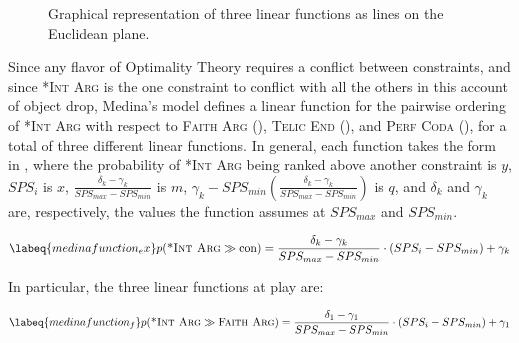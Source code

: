 \begin{figure}[htb]
\caption{Graphical representation of three linear functions as lines on the Euclidean plane.}
\end{figure}

Since any flavor of Optimality Theory requires a conflict between constraints, and since \textsc{*Int Arg} is the one constraint to conflict with all the others in this account of object drop, Medina's model defines a linear function for the pairwise ordering of \textsc{*Int Arg} with respect to \textsc{Faith Arg} (), \textsc{Telic End} (), and \textsc{Perf Coda} (), for a total of three different linear functions. In general, each function takes the form in , where the probability of \textsc{*Int Arg} being ranked above another constraint is $y$, $SPS_i$ is \alert{$x$}, $\frac{\delta_k - \gamma_k}{SPS_{max} - SPS_{min}}$ is \alert{$m$}, $\gamma_k - SPS_{min} (\frac{\delta_k - \gamma_k}{SPS_{max} - SPS_{min}})$ is \alert{$q$}, and $\delta_k$ and $\gamma_k$ are, respectively, the values the function assumes at $SPS_{max}$ and $SPS_{min}$.

\begin{equation} \labeq{medinafunction_ex}
p(\textsc{*Int Arg} \gg \textrm{con}) = \frac{\delta_k - \gamma_k}{SPS_{max} - SPS_{min}} \cdot ({SPS_{i} - SPS_{min}}) + \gamma_k
\end{equation}

In particular, the three linear functions at play are:

\begin{equation} \labeq{medinafunction_f}
p(\textsc{*Int Arg} \gg \textsc{Faith Arg}) = \frac{\delta_1 - \gamma_1}{SPS_{max} - SPS_{min}} \cdot ({SPS_{i} - SPS_{min}}) + \gamma_1
\end{equation}

